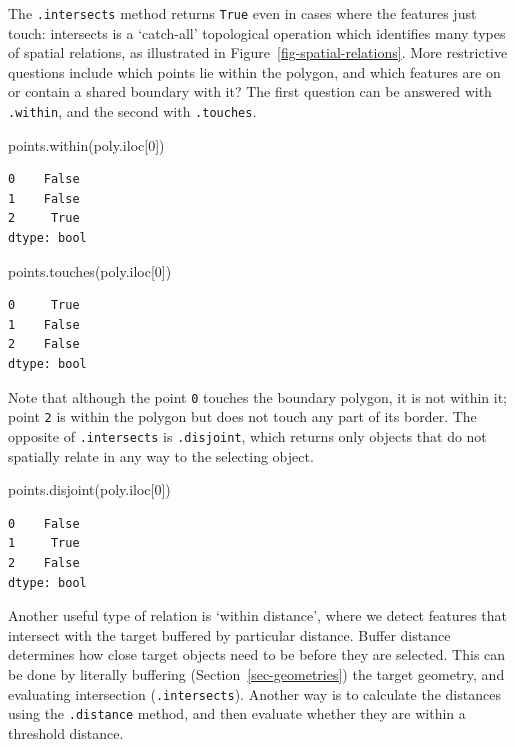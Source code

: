\documentclass[
  letterpaper,
]{krantz}
\newenvironment{Shaded}{\begin{snugshade}}{\end{snugshade}}
\newcommand{\DecValTok}[1]{\textcolor[rgb]{0.68,0.00,0.00}{#1}}
\newcommand{\NormalTok}[1]{\textcolor[rgb]{0.00,0.23,0.31}{#1}}
\begin{document}
The \texttt{.intersects} method returns \texttt{True} even in cases
where the features just touch: intersects is a `catch-all' topological
operation which identifies many types of spatial relations, as
illustrated in Figure~\ref{fig-spatial-relations}. More restrictive
questions include which points lie within the polygon, and which
features are on or contain a shared boundary with it? The first question
can be answered with \texttt{.within}, and the second with
\texttt{.touches}.

\begin{Shaded}
\begin{Highlighting}[]
\NormalTok{points.within(poly.iloc[}\DecValTok{0}\NormalTok{])}
\end{Highlighting}
\end{Shaded}

\begin{verbatim}
0    False
1    False
2     True
dtype: bool
\end{verbatim}

\begin{Shaded}
\begin{Highlighting}[]
\NormalTok{points.touches(poly.iloc[}\DecValTok{0}\NormalTok{])}
\end{Highlighting}
\end{Shaded}

\begin{verbatim}
0     True
1    False
2    False
dtype: bool
\end{verbatim}

Note that although the point \texttt{0} touches the boundary polygon, it
is not within it; point \texttt{2} is within the polygon but does not
touch any part of its border. The opposite of \texttt{.intersects} is
\texttt{.disjoint}, which returns only objects that do not spatially
relate in any way to the selecting object.

\begin{Shaded}
\begin{Highlighting}[]
\NormalTok{points.disjoint(poly.iloc[}\DecValTok{0}\NormalTok{])}
\end{Highlighting}
\end{Shaded}

\begin{verbatim}
0    False
1     True
2    False
dtype: bool
\end{verbatim}

Another useful type of relation is `within distance', where we detect
features that intersect with the target buffered by particular distance.
Buffer distance determines how close target objects need to be before
they are selected. This can be done by literally buffering
(Section~\ref{sec-geometries}) the target geometry, and evaluating
intersection (\texttt{.intersects}). Another way is to calculate the
distances using the \texttt{.distance} method, and then evaluate whether
they are within a threshold distance.
\end{document}
